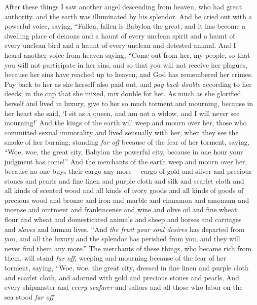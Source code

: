 \begin{biblechapter} %
 After these things I saw another angel descending from heaven, who had great authority, and the earth was illuminated by his splendor.
\verse And he cried out with a powerful voice, saying,
\verse “Fallen, fallen is Babylon the great, 
and it has become a dwelling place of demons 
and a haunt of every unclean spirit 
and a haunt of every unclean bird 
and a haunt of every unclean and detested animal.
\verse And I heard another voice from heaven saying,
\verse “Come out from her, my people, 
so that you will not participate in her sins, 
and so that you will not receive her plagues,
\verse because her sins have reached up to heaven, 
and God has remembered her crimes.
\verse Pay back to her as she herself also paid out, 
and \textit{pay back double} according to her deeds; 
in the cup that she mixed, mix double for her.
\verse As much as she glorified herself and lived in luxury, 
give to her so much torment and mourning, 
because in her heart she said, 
‘I sit as a queen, and am not a widow, 
and I will never see mourning!’
\verse And the kings of the earth will weep and mourn over her, those who committed sexual immorality and lived sensually with her, when they see the smoke of her burning,
\verse standing \textit{far off} because of the fear of her torment, saying, “Woe, woe, the great city, 
Babylon the powerful city, 
because in one hour your judgment has come!”
\verse And the merchants of the earth weep and mourn over her, because no one buys their cargo any more—
\verse cargo of gold and silver and precious stones and pearls and fine linen and purple cloth and silk and scarlet cloth and all kinds of scented wood and all kinds of ivory goods and all kinds of goods of precious wood and bronze and iron and marble
\verse and cinnamon and amomum and incense and ointment and frankincense and wine and olive oil and fine wheat flour and wheat and domesticated animals and sheep and horses and carriages and \textit{slaves} and human lives.
\verse “And \textit{the fruit your soul desires} has departed from you, 
and all the luxury and the splendor has perished from you, 
and they will never find them any more.”
\verse The merchants of these things, who became rich from them, will stand \textit{far off}, weeping and mourning because of the fear of her torment,
\verse saying,
\verse “Woe, woe, the great city, 
dressed in fine linen and purple cloth and scarlet cloth, 
and adorned with gold and precious stones and pearls,
\verse And every shipmaster and \textit{every seafarer} and sailors and all those who labor on the sea stood \textit{far off}

\end{biblechapter}
